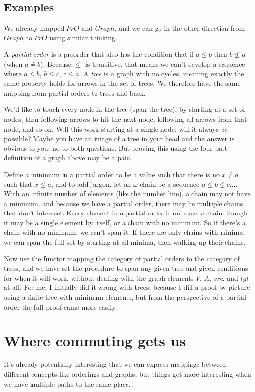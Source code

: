 \documentclass[11pt]{article}
\begin{document}
\subsection{Examples} We already mapped $PrO$ and $Graph$, and we can go in the other
direction from $Graph$ to $PrO$ using similar thinking.

A {\em partial order} is a preorder that also has the condition that if $a\leq b$ then
$b\not\leq a$ (when $a\neq b$). Because $\leq$ is transitive, that means we can't
develop a sequence where $a\leq b$, $b\leq c$, $c\leq a$.
A {\em tree} is a graph with no cycles, meaning exactly the same property holds for arrows
in the set of trees. We therefore have the same mapping from partial orders to trees and
back.

We'd like to touch every node in the tree (span the tree), by starting at a set of
nodes, then following arrows to hit the next node, following all arrows from that node, and so on.
Will this work starting at a single node; will it always be possible? Maybe you have an
image of a tree in your head and the answer is obvious to you: no to both questions.
But proving this using the four-part definition of a graph above may be a pain.

Define a minimum in a partial order to be a value such that there is no $x\neq a$ such that
$x\leq a$, and to add jargon, let an $\omega$-chain be a sequence $a\leq b\leq
c\dots$. With an infinite number of elements (like the number line), a chain may not have
a minimum, and because we have a partial order, there may be multiple chains that don't
intersect. Every element in a partial order is on some $\omega$-chain, though it may be a
single element by itself, or a chain with no minimum. So if there's a chain with no
minimum, we can't span it.  If there are only chains with minima, we can span the full
set by starting at all minima, then walking up their chains.

Now use the functor mapping the category of partial orders to the category of trees,
and we have set the procedure to span any given tree and given conditions for when it will work,
without dealing with the graph elements $V$, $A$, $src$, and $tgt$ at all.
For me, I initially did it wrong with trees, because I did a proof-by-picture using
a finite tree with minimum elements, but from the perspective of a partial order the
full proof came more easily.

\section{Where commuting gets us} It's already potentially interesting that we can
express mappings between different concepts like orderings and graphs, but things get more
interesting when we have multiple paths to the same place.
\end{document}
